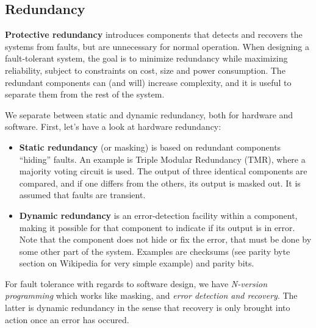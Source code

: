 \subsection{Redundancy}
\textbf{Protective redundancy} introduces components that detects and recovers the systems from faults, but are unnecessary for normal operation. When designing a fault-tolerant system, the goal is to minimize redundancy while maximizing reliability, subject to constraints on cost, size and power consumption. The redundant components can (and will) increase complexity, and it is useful to separate them from the rest of the system. 

We separate between static and dynamic redundancy, both for hardware and software. First, let's have a look at hardware redundancy:
\begin{itemize}
    \item \textbf{Static redundancy} (or masking) is based on redundant components ``hiding'' faults. An example is Triple Modular Redundancy (TMR), where a majority voting circuit is used. The output of three identical components are compared, and if one differs from the others, its output is masked out. It is assumed that faults are transient.
    \item \textbf{Dynamic redundancy} is an error-detection facility within a component, making it possible for that component to indicate if its output is in error. Note that the component does not hide or fix the error, that must be done by some other part of the system. Examples are checksums (see parity byte section on Wikipedia for very simple example) and parity bits.
\end{itemize}

For fault tolerance with regards to software design, we have \emph{N-version programming} which works like masking, and \emph{error detection and recovery}. The latter is dynamic redundancy in the sense that recovery is only brought into action once an error has occured.

